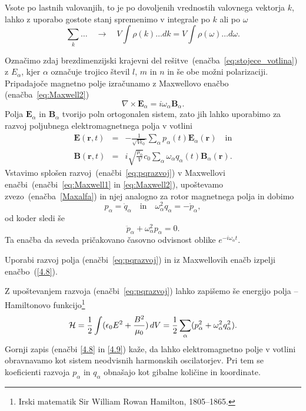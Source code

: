 Vsote po lastnih valovanjih, to je po dovoljenih vrednostih valovnega vektorja $k$,
lahko z uporabo gostote stanj spremenimo v integrale po $k$ ali po $\omega$
\begin{equation}
\sum_{k}\ldots \quad \rightarrow \quad V\int\rho(k)\ldots dk=V\int\rho(\omega)\ldots d\omega.
\label{4.5}
\end{equation}

Označimo zdaj brezdimenzijski krajevni del rešitve~(enačba~\ref{eq:stojece_votlina}) z 
$E_{\alpha}$, kjer $\alpha$
označuje trojico števil $l$, $m$ in $n$ in še obe možni polarizaciji. 
Pripadajoče magnetno polje izračunamo z Maxwellovo enačbo (enačba~\ref{eq:Maxwell2}) 
\begin{equation}
\nabla\times\mathbf{E}_{\alpha}=i\omega_\alpha\mathbf{B}_{\alpha}.
\label{Maxalfa}
\end{equation}
Polja $\mathbf{E}_{\alpha}$ in $\mathbf{B}_{\alpha}$ tvorijo poln ortogonalen
sistem, zato jih lahko uporabimo za razvoj poljubnega elektromagnetnega polja v votlini
\begin{eqnarray}
\mathbf{E}(\mathbf{r},t) & = & -\frac{1}{\sqrt{V\epsilon_{0}}}
\sum_{\alpha}p_{\alpha}(t)\mathbf{E}_{\alpha}(\mathbf{r}) \quad \mathrm{in}\nonumber \\
\mathbf{B}(\mathbf{r},t) & = & i\sqrt{\frac{\mu_{0}}{V}}c_0\sum_{\alpha}
\omega_{\alpha}q_{\alpha}(t)\mathbf{B}_{\alpha}(\mathbf{r}).
\label{eq:pqrazvoj}
\end{eqnarray}
Vstavimo splošen razvoj~(enačbi~\ref{eq:pqrazvoj}) v Maxwellovi enačbi~(enačbi~\ref{eq:Maxwell1}
in \ref{eq:Maxwell2}), upoštevamo zvezo~(enačba~\ref{Maxalfa}) in njej analogno za rotor magnetnega polja
in dobimo 
\begin{equation}
p_{\alpha}=\dot{q}_{\alpha} \quad \mathrm{in} \quad 
\omega_{\alpha}^{2}q_{\alpha}=-\dot{p}_{\alpha},
\label{4.7}
\end{equation}
od koder sledi še 
\begin{equation}
\ddot{p}_{\alpha}+\omega_{\alpha}^{2}p_{\alpha}=0.
\label{4.8}
\end{equation}
Ta enačba da seveda pričakovano časovno odvisnost oblike $e^{-i \omega_\alpha t}$.

\begin{definition}
 Uporabi razvoj polja (enačbi~\ref{eq:pqrazvoj}) in iz Maxwellovih enačb izpelji
 enačbo~(\ref{4.8}).
\end{definition}

Z upoštevanjem razvoja (enačbi~\ref{eq:pqrazvoj}) lahko zapišemo še energijo 
polja -- Hamiltonovo 
funkcijo\footnote{Irski matematik Sir William Rowan Hamilton, 1805--1865.}
\begin{equation}
{\cal H}=\frac{1}{2}\int(\epsilon_{0}E^{2}+\frac{B^{2}}{\mu_0})\, 
dV=\frac{1}{2}\sum_{\alpha}(p_{\alpha}^{2}+\omega_{\alpha}^{2}q_{\alpha}^{2}).
\label{4.9}
\end{equation}
Gornji zapis (enačbi \ref{4.8} in \ref{4.9}) kaže, 
da lahko elektromagnetno polje v votlini
obravnavamo kot sistem neodvisnih harmonskih oscilatorjev. 
Pri tem se koeficienti razvoja $p_{\alpha}$ in $q_{\alpha}$ obnašajo kot
gibalne količine in koordinate. 

